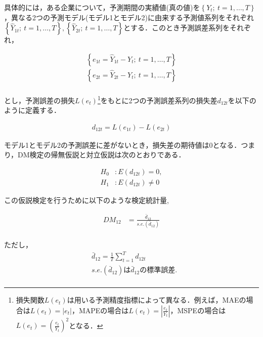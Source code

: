 \documentclass[a4paper，11pt]{jsarticle}
\begin{document}
具体的には，ある企業について，予測期間の実績値(真の値)を$\left\{Y_t ;\  t=1, \ldots, T\right\}$，異なる2つの予測モデル(モデル1とモデル2)に由来する予測値系列をそれぞれ$\left\{\hat{Y}_{1t};\  t=1, \ldots, T\right\}, \left\{\hat{Y}_{2t};\  t=1, \ldots, T\right\}$とする．このとき予測誤差系列をそれぞれ，

\begin{equation}
  \begin{split}
    \left\{ e_{1t} = \hat{Y}_{1t} - Y_t ;\  t=1, \ldots, T \right\} \\
    \left\{ e_{2t} = \hat{Y}_{2t} - Y_t ;\  t=1, \ldots, T \right\} \\
  \end{split}
\end{equation}

\noindent
とし，予測誤差の損失$L(e_t)$\footnote{損失関数$L(e_t)$は用いる予測精度指標によって異なる．例えば，MAEの場合は$L(e_t)=|e_t|$，MAPEの場合は$L(e_t)=\left|\frac{e_t}{Y_t}\right|$，MSPEの場合は$L(e_t)=\left(\frac{e_t}{Y_t}\right)^2$となる．}をもとに2つの予測誤差系列の損失差$d_{12t}$を以下のように定義する．

\begin{equation}
  \begin{split}
    d_{12t} = L(e_{1t}) - L(e_{2t})
  \end{split}
\end{equation}

\noindent
モデル1とモデル2の予測誤差に差がないとき，損失差の期待値は0となる．つまり，DM検定の帰無仮説と対立仮説は次のとおりである．

\begin{equation}
  \begin{split}
    H_0 &: E(d_{12t}) = 0,  \\
    H_1 &: E(d_{12t}) \neq 0
  \end{split}
\end{equation}

\noindent
この仮説検定を行うために以下のような検定統計量,

\begin{equation}
  \begin{split}
    DM_{12} &= \frac {\bar{d}_{12}} {s.e.(\bar{d}_{12})} \\
  \end{split}
\end{equation}

ただし，
\begin{equation}
  \begin{split}
    &\bar{d}_{12} = \frac {1} {T} \sum^{T}_{t=1} d_{12t} \\
    &s.e.(\bar{d}_{12}) は\bar{d}_{12}の標準誤差.\\
  \end{split}
\end{equation}
\end{document}
